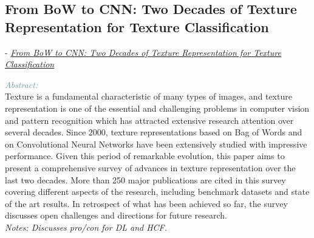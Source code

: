 \documentclass[]{article}
\newcommand{\paperentry}[4]{
            \hangindent=1cm
            \cite{#1} - \href{run:../References/#3}{\textcolor{Sepia}{\textit{#2}}}
            
            \noindent            
            \begin{minipage}[t]{0.1\linewidth}\hfill\end{minipage}
            \begin{minipage}[t]{0.8\linewidth}\textcolor{CadetBlue}{{\textit{Abstract:}}}\\#4\end{minipage}
            \vspace{.25cm}
          }
\begin{document}
 \subsection{From BoW to CNN: Two Decades of Texture Representation for Texture Classification}
   \paperentry{Liu2019BOW}
 {From BoW to CNN: Two Decades of Texture Representation for Texture Classification}
 {Existing Approaches to Texture Analysis/Deep neural networks for texture classification—A theoretical analysis.pdf}
 {Texture is a fundamental characteristic of many types of images, and texture representation is one of the essential and challenging problems in computer vision and pattern recognition which has attracted extensive research attention over several decades. Since 2000, texture representations based on Bag of Words and on Convolutional Neural Networks have been extensively studied with impressive performance. Given this period of remarkable evolution, this paper aims to present a comprehensive survey of advances in texture representation over the last two decades. More than 250 major publications are cited in this survey covering different aspects of the research, including benchmark datasets and state of the art results. In retrospect of what has been achieved so far, the survey discusses open challenges and directions for future research.
 	\\\emph{Notes: Discusses pro/con for DL and HCF.}} \\ 
 
\end{document}
